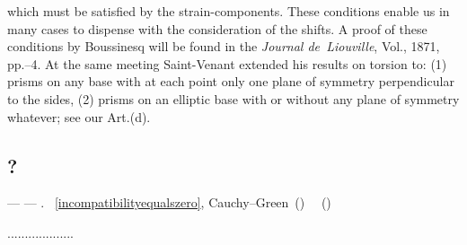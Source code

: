 \begin{tcolorbox}[breakable, enhanced, colback = green!11, before upper={\parindent3.2ex}, parbox = false]
\noindent
which must be satisfied by the strain-components. These conditions enable us in many cases to dispense with the consideration of the shifts. A proof of these conditions by Boussinesq will be found in the \emph{Journal de~Liouville}, Vol., 1871, pp.\hbox{--}4. At the same meeting Saint-Venant extended his results on torsion to\:: (1) prisms on any base with at each point only one plane of symmetry perpendicular to the sides, (2) prisms on an elliptic base with or without any plane of symmetry whatever\:; see our Art.\:(d).
\par
\end{tcolorbox}


\subsection*{?}

\:--- \:---
.
~\eqref{incompatibilityequalszero}, 
Cauchy\hbox{--}Green~()
~~()

...................

